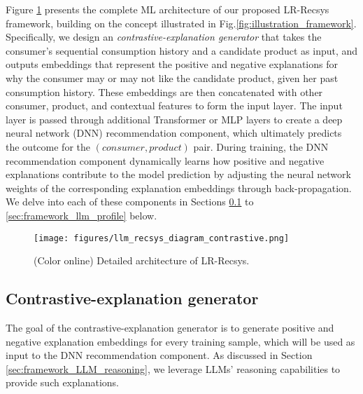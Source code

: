 Figure \ref{fig:llm_recsys_diagram} presents the complete ML architecture of our proposed LR-Recsys framework, building on the concept illustrated in Fig.\ref{fig:illustration_framework}. Specifically, we design an \emph{contrastive-explanation generator} that takes the consumer's sequential consumption history and a candidate product as input, and outputs embeddings that represent the positive and negative explanations for why the consumer may or may not like the candidate product, given her past consumption history. These embeddings are then concatenated with other consumer, product, and contextual features to form the input layer. The input layer is passed through additional Transformer or MLP layers to create a deep neural network (DNN) recommendation component, which ultimately predicts the outcome for the $(consumer, product)$ pair. During training, the DNN recommendation component dynamically learns how positive and negative explanations contribute to the model prediction by adjusting the neural network weights of the corresponding explanation embeddings through back-propagation. We delve into each of these components in Sections \ref{sec:framework_explanation_generator} to \ref{sec:framework_llm_profile} below.
\begin{figure}[hbtp!]
    \centering
    \texttt{[image: figures/llm\_recsys\_diagram\_contrastive.png]}
    \caption{(Color online) Detailed architecture of LR-Recsys.}\label{fig:llm_recsys_diagram}
\end{figure}




\subsection{Contrastive-explanation generator}
\label{sec:framework_explanation_generator}
The goal of the contrastive-explanation generator is to generate positive and negative explanation embeddings for every training sample, which will be used as input to the DNN recommendation component. As discussed in Section \ref{sec:framework_LLM_reasoning}, we leverage LLMs' reasoning capabilities to provide such explanations. 

